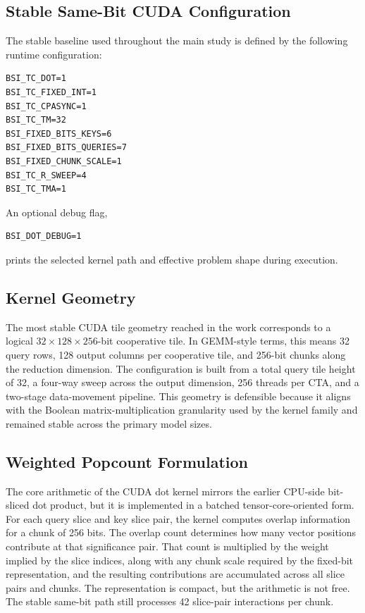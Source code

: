 \subsection{Stable Same-Bit CUDA Configuration}
The stable baseline used throughout the main study is defined by the following runtime configuration:

\begin{verbatim}
BSI_TC_DOT=1
BSI_TC_FIXED_INT=1
BSI_TC_CPASYNC=1
BSI_TC_TM=32
BSI_FIXED_BITS_KEYS=6
BSI_FIXED_BITS_QUERIES=7
BSI_FIXED_CHUNK_SCALE=1
BSI_TC_R_SWEEP=4
BSI_TC_TMA=1
\end{verbatim}

An optional debug flag,

\begin{verbatim}
BSI_DOT_DEBUG=1
\end{verbatim}

prints the selected kernel path and effective problem shape during execution.

\subsection{Kernel Geometry}
The most stable CUDA tile geometry reached in the work corresponds to a logical $32 \times 128 \times 256$-bit cooperative tile. In GEMM-style terms, this means 32 query rows, 128 output columns per cooperative tile, and 256-bit chunks along the reduction dimension. The configuration is built from a total query tile height of 32, a four-way sweep across the output dimension, 256 threads per CTA, and a two-stage data-movement pipeline. This geometry is defensible because it aligns with the Boolean matrix-multiplication granularity used by the kernel family and remained stable across the primary model sizes.

\subsection{Weighted Popcount Formulation}
The core arithmetic of the CUDA dot kernel mirrors the earlier CPU-side bit-sliced dot product, but it is implemented in a batched tensor-core-oriented form. For each query slice and key slice pair, the kernel computes overlap information for a chunk of 256 bits. The overlap count determines how many vector positions contribute at that significance pair. That count is multiplied by the weight implied by the slice indices, along with any chunk scale required by the fixed-bit representation, and the resulting contributions are accumulated across all slice pairs and chunks. The representation is compact, but the arithmetic is not free. The stable same-bit path still processes 42 slice-pair interactions per chunk.


